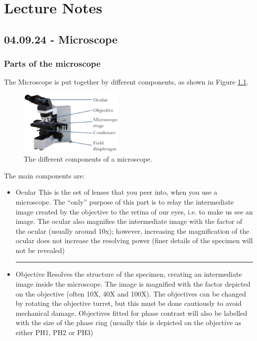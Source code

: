 \chapter{Lecture Notes}

\section{04.09.24 - Microscope}

\subsection{Parts of the microscope}
The Microscope is put together by different components, as shown in Figure \ref{fig:MicroscopeComponents}. 

\begin{figure}[h]
    \centering
    \includegraphics[width=0.45\textwidth]{Figures/MicroscopeComponents.png}
    \caption{The different components of a microscope.}
    \label{fig:MicroscopeComponents}
\end{figure}

The main components are: 
\begin{highlight}
    \begin{itemize}

        \item Ocular
        \subitem This is the set of lenses that you peer into, when you use a microscope. The “only” purpose of this part is to relay the intermediate image created by the objective to the retina of our eyes, i.e. to make us see an image. The ocular also magnifies the intermediate image with the factor of the ocular (usually around 10x); however, increasing the magnification of the ocular does not increase the resolving power (finer details of the specimen will not be 
        revealed)

        \vspace{5pt}\hrule\vspace{5pt}

        \item Objective
        \subitem Resolves the structure of the specimen, creating an intermediate image inside the microscope. The image is magnified with the factor depicted on the objective (often 10X, 40X and 100X). The objectives can be changed by rotating the objective turret, but this must be done cautiously to avoid mechanical damage. Objectives fitted for phase contrast will also be labelled with the size of the phase ring (usually this is depicted on the objective as either PH1, PH2 or PH3)

\end{itemize}
\end{highlight}

